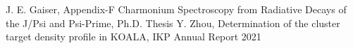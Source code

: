 \documentclass[fleqn,twocolumn,a4paper]{ikpar}
\begin{document}
\par
\medskip

\begin{thebibliography}{99}
 J. E. Gaiser, Appendix-F Charmonium Spectroscopy from Radiative Decays of the J/Psi and Psi-Prime, Ph.D. Thesis
 Y. Zhou, Determination of the cluster target density profile in KOALA, IKP Annual Report 2021
\end{thebibliography}
\end{document}
